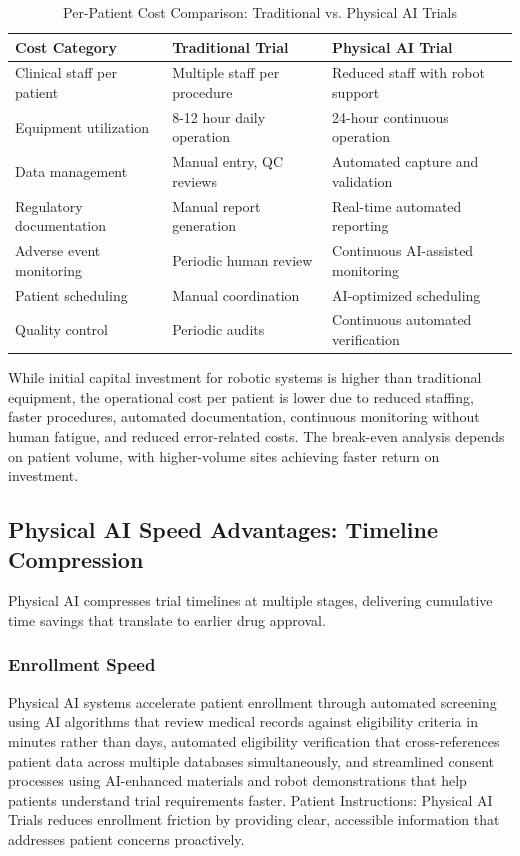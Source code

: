 \begin{table}[H]
\centering
\caption{Per-Patient Cost Comparison: Traditional vs. Physical AI Trials}
\label{tab:cost-comparison}
\small
\begin{tabularx}{\textwidth}{l X X}
\toprule
\textbf{Cost Category} & \textbf{Traditional Trial} & \textbf{Physical AI Trial} \\
\midrule
Clinical staff per patient & Multiple staff per procedure & Reduced staff with robot support \\
Equipment utilization & 8-12 hour daily operation & 24-hour continuous operation \\
Data management & Manual entry, QC reviews & Automated capture and validation \\
Regulatory documentation & Manual report generation & Real-time automated reporting \\
Adverse event monitoring & Periodic human review & Continuous AI-assisted monitoring \\
Patient scheduling & Manual coordination & AI-optimized scheduling \\
Quality control & Periodic audits & Continuous automated verification \\
\bottomrule
\end{tabularx}
\end{table}

While initial capital investment for robotic systems is higher than traditional
equipment, the operational cost per patient is lower due to reduced staffing,
faster procedures, automated documentation, continuous monitoring without human
fatigue, and reduced error-related costs. The break-even analysis depends on
patient volume, with higher-volume sites achieving faster return on investment.

\subsection{Physical AI Speed Advantages: Timeline Compression}
\label{subsec:financial-speed}

Physical AI compresses trial timelines at multiple stages, delivering cumulative
time savings that translate to earlier drug approval.

\subsubsection{Enrollment Speed}

Physical AI systems accelerate patient enrollment through automated screening
using AI algorithms that review medical records against eligibility criteria
in minutes rather than days, automated eligibility verification that
cross-references patient data across multiple databases simultaneously, and
streamlined consent processes using AI-enhanced materials and robot
demonstrations that help patients understand trial requirements faster.
Patient Instructions: Physical AI Trials \cite{patient-instructions-paper}
reduces enrollment friction by providing clear, accessible information that
addresses patient concerns proactively.

